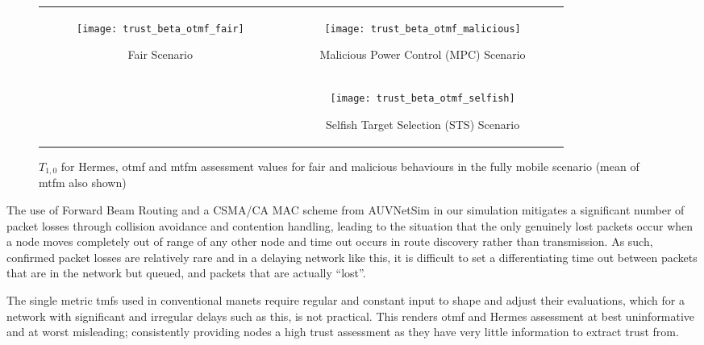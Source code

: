 \begin{figure*}[t]
  \centering
  \begin{tabular}{cc}
  \multirow{2}{*}{
  \begin{subfigure}{0.5\textwidth}	
    \texttt{[image: trust\_beta\_otmf\_fair]}
    \caption{Fair Scenario}
    \label{fig:all_mobile_fair_beta}
  \end{subfigure}
  }&
  \begin{subfigure}{0.5\textwidth}
    \texttt{[image: trust\_beta\_otmf\_malicious]} 
    \caption{Malicious Power Control (MPC) Scenario}
    \label{fig:all_mobile_badmouthing_beta}
  \end{subfigure} \\
  &
  \begin{subfigure}{0.5\textwidth}	
    \texttt{[image: trust\_beta\_otmf\_selfish]} 
    \caption{Selfish Target Selection (STS) Scenario}
    \label{fig:all_mobile_selfish_beta}
  \end{subfigure}
\end{tabular}
  \caption{$T_{1,0}$ for Hermes, \gls{otmf} and \gls{mtfm} assessment values for fair and malicious behaviours in the fully mobile scenario (mean of \gls{mtfm} also shown)}
  \label{fig:otmf_beta_comparison}
\end{figure*}
%
The use of Forward Beam Routing and a CSMA/CA MAC scheme from AUVNetSim \cite{Miquel2008} in our simulation mitigates a significant number of packet losses through collision avoidance and contention handling, leading to the situation that the only genuinely lost packets occur when a node moves completely out of range of any other node and time out occurs in route discovery rather than transmission.
As such, confirmed packet losses are relatively rare and in a delaying network like this, it is difficult to set a differentiating time out between packets that are in the network but queued, and packets that are actually ``lost''.

The single metric \glspl{tmf} used in conventional \gls{manet}s require regular and constant input to shape and adjust their evaluations, which for a network with significant and irregular delays such as this, is not practical.
This renders \gls{otmf} and Hermes assessment at best uninformative and at worst misleading; consistently providing nodes a high trust assessment as they have very little information to extract trust from. 

